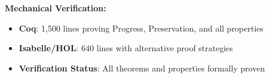 \begin{table}[t]
\vspace{0.2cm}

\textbf{Mechanical Verification:}
\begin{itemize}[leftmargin=*, noitemsep, topsep=2pt]
    \item \textbf{Coq}: 1,500 lines proving Progress, Preservation, and all properties
    \item \textbf{Isabelle/HOL}: 640 lines with alternative proof strategies
    \item \textbf{Verification Status}: All theorems and properties formally proven \checkmark
\end{itemize}
\end{table}

